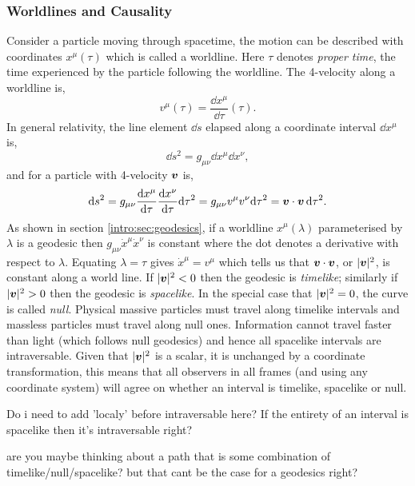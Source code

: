 \subsubsection{Worldlines and Causality}
Consider a particle moving through spacetime, the motion can be described with coordinates $x^\mu(\tau)$ which is called a worldline. Here $\tau$ denotes {\it proper time}, the time experienced by the particle following the worldline. The 4-velocity along a worldline is, 
\begin{equation}
v^\mu(\tau) = \frac{\dd x^\mu}{\dd \tau}(\tau).
\end{equation}
In general relativity, the line element $\dd s$ elapsed along a coordinate interval $\dd x^\mu$ is,
\begin{equation}
\dd s ^2 = g_{\mu\nu}\dd x^\mu \dd x^\nu,
\end{equation}
and for a particle with 4-velocity $\boldsymbol{v}$ is,
\begin{equation}
\dd s ^2 = g_{\mu\nu} \frac{\dd x^\mu}{\dd \tau}  \frac{\dd x^\nu}{\dd \tau} \dd \tau^2 = g_{\mu\nu} v^\mu v^\nu \dd \tau^2 = \boldsymbol{v} \cdot \boldsymbol{v} \,\dd \tau^2. 
\end{equation}
As shown in section \ref{intro:sec:geodesics}, if a worldline $x^\mu(\lambda)$ parameterised by $\lambda$ is a geodesic then $g_{\mu\nu} \dot{x}^\mu \dot{x}^\nu$ is constant where the dot denotes a derivative with respect to $\lambda$. Equating $\lambda=\tau$ gives $\dot{x}^\mu = v^\mu$ which tells us that $\boldsymbol{v} \cdot \boldsymbol{v}$, or $|\boldsymbol{v}|^2$, is constant along a world line. If $|\boldsymbol{v}|^2<0$ then the geodesic is {\it timelike}; similarly if $|\boldsymbol{v}|^2>0$ then the geodesic is {\it spacelike}. In the special case that $|\boldsymbol{v}|^2=0$, the curve is called {\it null}. Physical massive particles must travel along timelike intervals and massless particles must travel along null ones. Information cannot travel faster than light (which follows null geodesics) and hence all spacelike intervals are intraversable. Given that $|\boldsymbol{v}|^2$ is a scalar, it is unchanged by a coordinate transformation, this means that all observers in all frames (and using any coordinate system) will agree on whether an interval is timelike, spacelike or null.

\color{red} Do i need to add 'localy' before intraversable here? If the entirety of an interval is spacelike then it's intraversable right? 

are you maybe thinking about a path that is some combination of timelike/null/spacelike? but that cant be the case for a geodesics right? \color{black}


